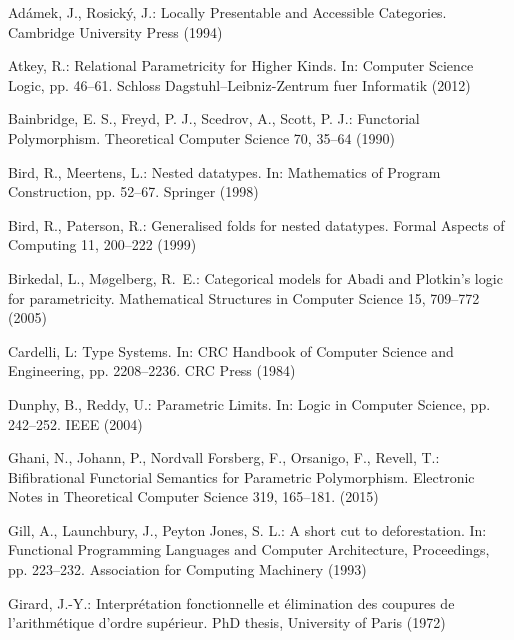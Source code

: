 \documentclass[runningheads]{llncs}
\begin{document}
\pagebreak

\begin{thebibliography}{8}


 Ad\'{a}mek, J., Rosick\'{y}, J.: Locally Presentable
  and Accessible Categories.  Cambridge University Press (1994)

 Atkey, R.: Relational Parametricity for Higher Kinds.
  In: Computer Science Logic, pp. 46--61. Schloss
  Dagstuhl--Leibniz-Zentrum fuer Informatik (2012)

 Bainbridge, E. S., Freyd, P. J., Scedrov, A., Scott, P. J.: 
  Functorial Polymorphism. Theoretical Computer Science 70, 35--64 (1990)

 Bird, R., Meertens, L.: Nested datatypes. 
    In: Mathematics of Program Construction, pp. 52--67. Springer (1998)

 Bird, R., Paterson, R.: Generalised folds for nested datatypes. 
  Formal Aspects of Computing 11, 200--222 (1999)

 Birkedal, L., M{\o}gelberg, R.~E.: 
  Categorical models for {A}badi and {P}lotkin's logic for parametricity.
    Mathematical Structures in Computer Science 15, 709--772 (2005)

 Cardelli, L: Type Systems. In: CRC Handbook of
  Computer Science and Engineering, pp. 2208--2236. CRC Press (1984)

 Dunphy, B., Reddy, U.: Parametric Limits.
    In: Logic in Computer Science, pp. 242--252. IEEE (2004)

 Ghani, N., Johann, P., Nordvall Forsberg, F.,
  Orsanigo, F., Revell, T.: Bifibrational Functorial Semantics for
  Parametric Polymorphism.  Electronic Notes in Theoretical Computer
  Science 319, 165--181. (2015)

 Gill, A., Launchbury, J., Peyton Jones, S. L.: A short
  cut to deforestation.  In: Functional Programming Languages and
  Computer Architecture, Proceedings, pp. 223--232. Association for
  Computing Machinery (1993)

 Girard, J.-Y.: Interpr\'etation fonctionnelle et
  \'elimination des coupures de l'arithmétique d'ordre sup\'erieur.
  PhD thesis, University of Paris (1972)
    

\end{thebibliography}
\end{document}
